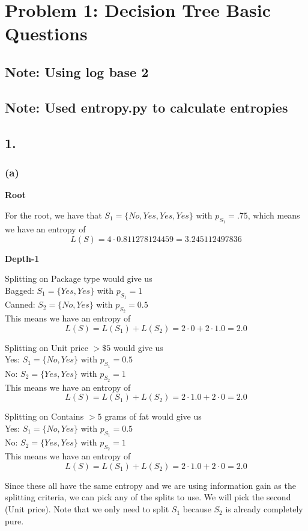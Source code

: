 \documentclass{article}
\begin{document}
\section*{Problem 1: Decision Tree Basic Questions}
\subsection*{Note: Using log base 2}
\subsection*{Note: Used entropy.py to calculate entropies}
\subsection*{1.}
\subsubsection*{(a)}
\textbf{Root}

For the root, we have that $S_1 = \{ No, Yes, Yes, Yes \}$ with $p_{S_1} = .75$,
which means we have an entropy of
\[ L(S) = 4 \cdot 0.811278124459 = 3.245112497836 \]

\noindent \textbf{Depth-1}

Splitting on Package type would give us \\
Bagged: $S_1 = \{ Yes, Yes \}$ with $p_{S_1} = 1$ \\
Canned: $S_2 = \{ No, Yes \}$ with $p_{S_2} = 0.5$ \\
This means we have an entropy of
\[ L(S) = L(S_1) + L(S_2) = 2 \cdot 0 + 2 \cdot 1.0 = 2.0 \]

Splitting on Unit price $> \$5$ would give us \\
Yes: $S_1 = \{ No, Yes \}$ with $p_{S_1} = 0.5$ \\
No: $S_2 = \{ Yes, Yes \} $ with $p_{S_2} = 1$ \\
This means we have an entropy of
\[ L(S) = L(S_1) + L(S_2) = 2 \cdot 1.0 + 2 \cdot 0 = 2.0 \]

Splitting on Contains $> 5$ grams of fat would give us \\
Yes: $S_1 = \{ No, Yes \}$ with $p_{S_1} = 0.5$ \\
No: $S_2 = \{ Yes, Yes \}$ with $p_{S_2} = 1$ \\
This means we have an entropy of
\[ L(S) = L(S_1) + L(S_2) = 2 \cdot 1.0 + 2 \cdot 0 = 2.0 \]

Since these all have the same entropy and we are using information gain as the splitting
criteria, we can pick any of the splits to use. We will pick the second (Unit price).
Note that we only need to split $S_1$ because $S_2$ is already completely pure.
\end{document}
